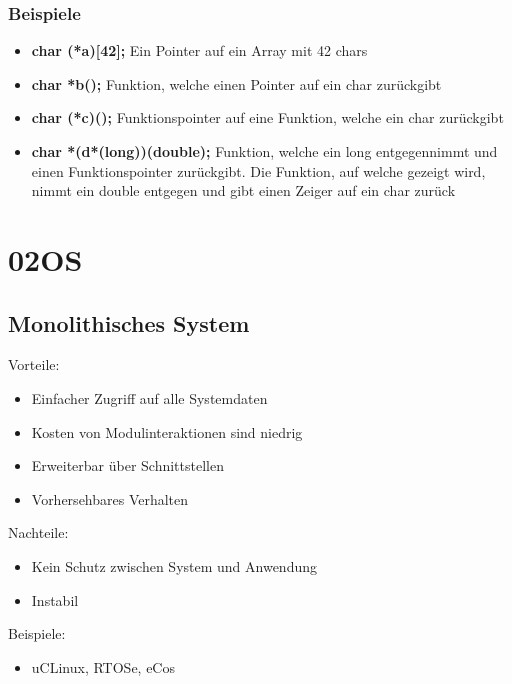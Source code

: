 \documentclass[a4paper]{scrreprt}
\begin{document}
\subsection{Beispiele}
\begin{itemize}
	\item \textbf{char (*a)[42];} Ein Pointer auf ein Array mit 42 chars
	\item \textbf{char *b();} Funktion, welche einen Pointer auf ein char zurückgibt
	\item \textbf{char (*c)();} Funktionspointer auf eine Funktion, welche ein char zurückgibt
	\item \textbf{char *(d*(long))(double);} Funktion, welche ein long entgegennimmt und einen Funktionspointer zurückgibt. Die Funktion, auf welche gezeigt wird, nimmt ein double entgegen und gibt einen Zeiger auf ein char zurück
\end{itemize}











\chapter{02OS}

\section{Monolithisches System}
Vorteile:
	\begin{itemize} 
		\item Einfacher Zugriff auf alle Systemdaten 
		\item Kosten von Modulinteraktionen sind niedrig
		\item Erweiterbar über Schnittstellen
		\item Vorhersehbares Verhalten 
	\end{itemize}
Nachteile:
	\begin{itemize}
		\item Kein Schutz zwischen System und Anwendung
		\item Instabil
	\end{itemize}

Beispiele:
	\begin{itemize}
		\item uCLinux, RTOSe, eCos
	\end{itemize}
	
\end{document}
